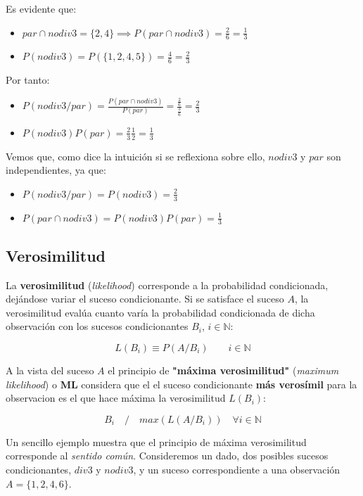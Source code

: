 \documentclass[11pt]{article}
\providecommand{\tightlist}{%
      \setlength{\itemsep}{0pt}\setlength{\parskip}{0pt}}
\begin{document}

    Es evidente que:
\begin{itemize}
\item \(par \cap nodiv3 = \{2,4\} \implies P(par \cap nodiv3)=\frac{2}{6}=\frac{1}{3}\)
\item \(P(nodiv3)=P(\{1,2,4,5\})=\frac{4}{6}=\frac{2}{3}\)
\end{itemize}

Por tanto:

\begin{itemize}
\tightlist
\item
  \(P(nodiv3 / par) =\frac{P(par \cap nodiv3)}{P(par)}=\frac{\frac{2}{6}}{\frac{3}{6}}=\frac{2}{3}\)
\item
  \(P(nodiv3)P(par)=\frac{2}{3}\frac{1}{2}=\frac{1}{3}\)
\end{itemize}

Vemos que, como dice la intuición si se reflexiona sobre ello,
\(nodiv3\) y \(par\) son independientes, ya que:
\begin{itemize}
\item \(P(nodiv3 / par) = P(nodiv3)=\frac{2}{3}\)
\item \(P(par \cap nodiv3)=P(nodiv3)P(par)=\frac{1}{3}\)
\end{itemize}



    \subsection{Verosimilitud}\label{verosimilitud}

La \textbf{verosimilitud} (\emph{likelihood}) corresponde a la
probabilidad condicionada, dejándose variar el suceso condicionante. Si
se satisface el suceso \(A\), la verosimilitud evalúa cuanto varía la
probabilidad condicionada de dicha observación con los sucesos
condicionantes \(B_i\), \(i \in \mathbb{N}\):

\[L(B_i)\equiv P(A/B_i)\qquad i \in \mathbb{N}\]

A la vista del suceso \(A\) el principio de \textbf{"máxima
verosimilitud"} (\emph{maximum likelihood}) o \textbf{ML} considera que
el el suceso condicionante \textbf{más verosímil} para la observacion es
el que hace máxima la verosimilitud \(L(B_i)\):

\[B_i \quad / \quad max(L(A/B_i)) \quad \forall i \in \mathbb{N}\]

    Un sencillo ejemplo muestra que el principio de máxima verosimilitud
corresponde al \emph{sentido común}. Consideremos un dado, dos posibles
sucesos condicionantes, \(div3\) y \(nodiv3\), y un suceso
correspondiente a una observación \(A=\{1,2,4,6\}\).
\end{document}
